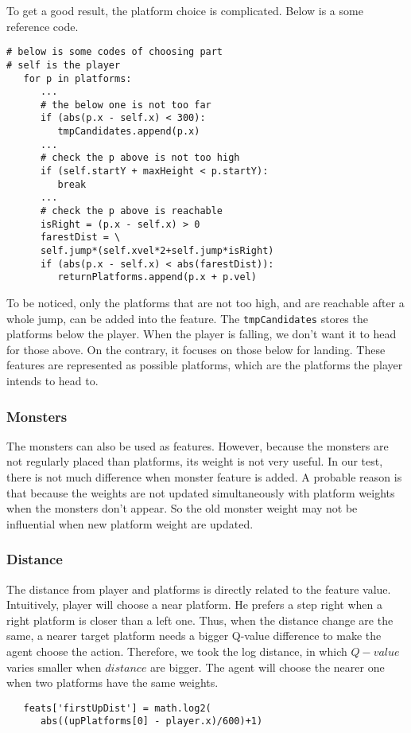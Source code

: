 \documentclass[final]{cvpr}
\begin{document}
   To get a good result, the platform choice is complicated. Below is a some reference code. 
\begin{lstlisting}
# below is some codes of choosing part
# self is the player
   for p in platforms:
      ...
      # the below one is not too far
      if (abs(p.x - self.x) < 300):
         tmpCandidates.append(p.x)
      ...
      # check the p above is not too high
      if (self.startY + maxHeight < p.startY):
         break
      ...
      # check the p above is reachable
      isRight = (p.x - self.x) > 0
      farestDist = \
      self.jump*(self.xvel*2+self.jump*isRight) 
      if (abs(p.x - self.x) < abs(farestDist)):
         returnPlatforms.append(p.x + p.vel)
\end{lstlisting}
   To be noticed, only the platforms that are not too high, and are reachable after a whole jump, can be added into the feature.
   The \verb|tmpCandidates| stores the platforms below the player. When the player is falling, we don't want it to head for those above.
   On the contrary, it focuses on those below for landing. 
   These features are represented as possible platforms, which are the platforms the player intends to head to.

\subsubsection{Monsters}
   The monsters can also be used as features. However, because the monsters are not regularly placed than platforms, its weight is not very useful.
   In our test, there is not much difference when monster feature is added. 
   A probable reason is that because the weights are not updated simultaneously with platform weights when the monsters don't appear.
   So the old monster weight may not be influential when new platform weight are updated.

\subsubsection{Distance}
   The distance from player and platforms is directly related to the feature value.
   Intuitively, player will choose a near platform. He prefers a step right when a right platform is closer than a left one.
   Thus, when the distance change are the same, a nearer target platform needs a bigger Q-value difference to make the agent choose the action.
   Therefore, we took the log distance, in which $Q-value$ varies smaller when $distance$ are bigger.
   The agent will choose the nearer one when two platforms have the same weights.
\begin{lstlisting}
   feats['firstUpDist'] = math.log2(
      abs((upPlatforms[0] - player.x)/600)+1) 
\end{lstlisting}
\end{document}
